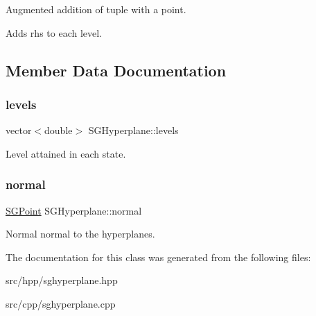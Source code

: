 Augmented addition of tuple with a point. 

Adds rhs to each level. 

\subsection{Member Data Documentation}
\mbox{\label{classSGHyperplane_a0da64d24816c2d70c84aeaf405035416}} 
\subsubsection{\texorpdfstring{levels}{levels}}
{\footnotesize\ttfamily vector$<$double$>$ S\+G\+Hyperplane\+::levels\hspace{0.3cm}{\ttfamily [private]}}

Level attained in each state. \mbox{\label{classSGHyperplane_ac5855eb45d21dc29a4770ad335a426e6}} 
\subsubsection{\texorpdfstring{normal}{normal}}
{\footnotesize\ttfamily \hyperlink{classSGPoint}{S\+G\+Point} S\+G\+Hyperplane\+::normal\hspace{0.3cm}{\ttfamily [private]}}

Normal normal to the hyperplanes. 

The documentation for this class was generated from the following files\+:\begin{DoxyCompactItemize}
\item 
src/hpp/sghyperplane.\+hpp\item 
src/cpp/sghyperplane.\+cpp\end{DoxyCompactItemize}
